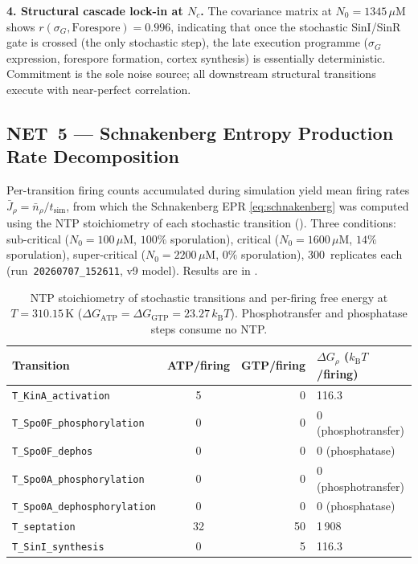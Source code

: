 \documentclass[11pt,a4paper]{article}
\newcommand{\kB}{k_{\mathrm{B}}}
\begin{document}
\textbf{4. Structural cascade lock-in at $N_c$.}
The covariance matrix at $N_0 = 1345\,\mu$M shows
$r(\sigma_G, \mathrm{Forespore}) = 0.996$, indicating that once the stochastic
SinI/SinR gate is crossed (the only stochastic step), the late execution
programme ($\sigma_G$ expression, forespore formation, cortex synthesis) is
essentially deterministic.  Commitment is the sole noise source; all downstream
structural transitions execute with near-perfect correlation.



\subsection{NET~5 --- Schnakenberg Entropy Production Rate Decomposition}
\label{ssec:t5}

Per-transition firing counts accumulated during simulation yield mean
firing rates $\bar J_\rho = \bar n_\rho / t_{\mathrm{sim}}$, from
which the Schnakenberg EPR \eqref{eq:schnakenberg} was computed using
the NTP stoichiometry of each stochastic transition ().
Three conditions: sub-critical ($N_0 = 100\,\mu$M, $100\%$ sporulation),
critical ($N_0 = 1600\,\mu$M, $14\%$ sporulation), super-critical
($N_0 = 2200\,\mu$M, $0\%$ sporulation), 300~replicates each
(run~\texttt{20260707\_152611}, v9 model).
Results are in .

\begin{table}[h]
\centering
\caption{NTP stoichiometry of stochastic transitions and per-firing free
  energy at $T = 310.15\,\mathrm{K}$
  ($\Delta G_{\mathrm{ATP}} = \Delta G_{\mathrm{GTP}} = 23.27\,\kB T$).
  Phosphotransfer and phosphatase steps consume no NTP.}
\label{tab:t5-stoich}
\begin{tabular}{lcrl}
\toprule
Transition & ATP/firing & GTP/firing & $\Delta G_\rho$ ($\kB T$/firing) \\
\midrule
\texttt{T\_KinA\_activation}        &  5 &  0 & 116.3 \\
\texttt{T\_Spo0F\_phosphorylation}  &  0 &  0 & 0 (phosphotransfer) \\
\texttt{T\_Spo0F\_dephos}           &  0 &  0 & 0 (phosphatase) \\
\texttt{T\_Spo0A\_phosphorylation}  &  0 &  0 & 0 (phosphotransfer) \\
\texttt{T\_Spo0A\_dephosphorylation}&  0 &  0 & 0 (phosphatase) \\
\texttt{T\_septation}               & 32 & 50 & 1\,908 \\
\texttt{T\_SinI\_synthesis}         &  0 &  5 & 116.3 \\
\bottomrule
\end{tabular}
\end{table}
\end{document}
